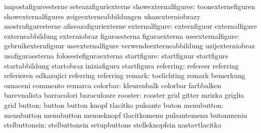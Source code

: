                                   impostafigureesterne             seteazafiguriexterne
             showexternalfigures: toonexternefiguren               showexternalfigures
                                  zeigeexterneabbildungen          ukazexterniobrazy
                                  mostrafiguresterne               afiseazafiguriexterne
                  externalfigure: externfiguur                     externalfigure
                                  externeabbildung                 externiobraz
                                  figuraesterna                    figuraexterna
               useexternalfigure: gebruikexternfiguur              useexternalfigure
                                  verwendeexterneabbildung         uzijexterniobraz
                                  usafiguraesterna                 folosestefiguraexterna
                     startfigure: startfiguur                      startfigure
                                  startabbildung                   startobraz
                                  iniziafigura                     startfigura
                       referring: refereer                         referring
                                  referieren                       odkazujici
                                  referring                        referring %
                          remark: toelichting                      remark
                                  bemerkung                        oznaceni
                                  commento                         remarca
                        colorbar: kleurenbalk                      colorbar
                                  farbbalken                       barevnalista
                                  barracolori                      baraculoare
                         rooster: rooster                          grid
                                  gitter                           mrizka
                                  griglia                          grid
                          button: button                           button
                                  knopf                            tlacitko
                                  pulsante                         buton
                      menubutton: menubutton                       menubutton
                                  menueknopf                       tlacitkomenu
                                  pulsantemenu                     butonmeniu
                   stelbuttonsin: stelbuttonsin                    setupbuttons
                                  stelleknopfein                   nastavtlacitka
